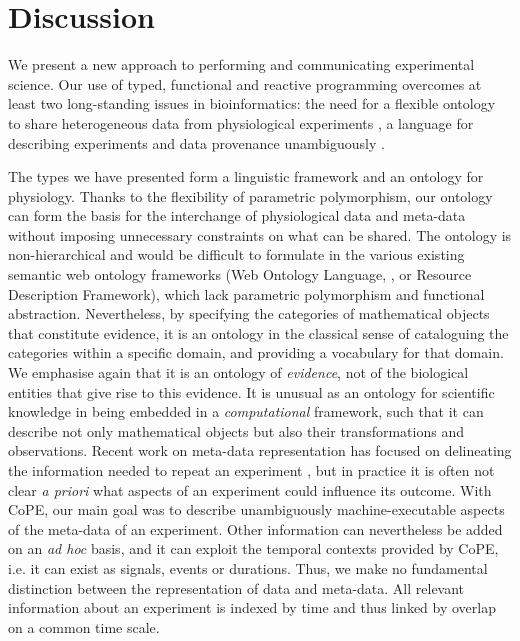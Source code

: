 \section*{Discussion}

We present a new approach to performing and communicating experimental
science.  Our use of typed, functional and reactive programming
overcomes at least two long-standing issues in bioinformatics: the
need for a flexible ontology to share heterogeneous data from
physiological experiments \citep{Amari2002}, a language for describing
experiments and data provenance unambiguously \citep{Pool2002,
  Murray-Rust2002}.

The types we have presented form a linguistic framework and an
ontology for physiology. Thanks to the flexibility of parametric
polymorphism, our ontology can form the basis for the interchange of
physiological data and meta-data without imposing unnecessary
constraints on what can be shared. The ontology is non-hierarchical
and would be difficult to formulate in the various existing semantic
web ontology frameworks (Web Ontology Language, \citep{owlref}, or
Resource Description Framework), which lack parametric polymorphism
and functional abstraction. Nevertheless, by specifying the categories
of mathematical objects that constitute evidence, it is an ontology in
the classical sense of cataloguing the categories within a specific
domain, and providing a vocabulary for that domain. We emphasise again
that it is an ontology of \emph{evidence}, not of the biological
entities that give rise to this evidence. It is unusual as an ontology
for scientific knowledge in being embedded in a \emph{computational}
framework, such that it can describe not only mathematical objects but
also their transformations and observations. Recent work on meta-data
representation \citep{Bower2009} has focused on delineating the
information needed to repeat an experiment \citep{Taylor2007,
  Gibson2008}, but in practice it is often not clear \emph{a priori}
what aspects of an experiment could influence its outcome. With CoPE,
our main goal was to describe unambiguously machine-executable aspects
of the meta-data of an experiment. Other information can nevertheless
be added on an \emph{ad hoc} basis, and it can exploit the temporal
contexts provided by CoPE, i.e. it can exist as signals, events or
durations. Thus, we make no fundamental distinction between the
representation of data and meta-data. All relevant information about
an experiment is indexed by time and thus linked by overlap on a
common time scale.

